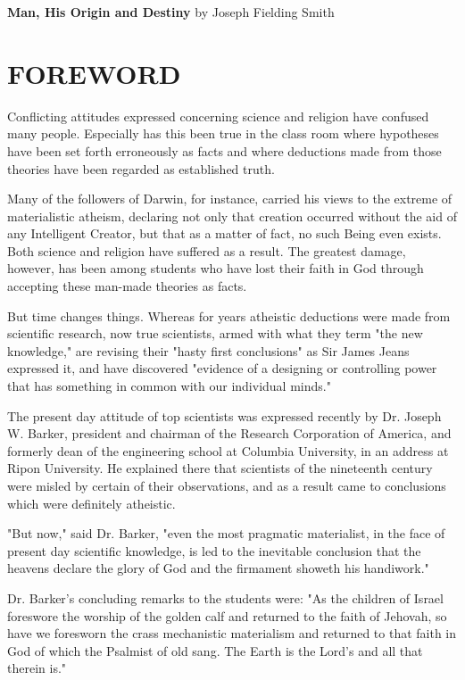 \begin{flushleft}
\fontsize{35}{35}\sffamily
\textbf{Man, His Origin and Destiny}
\Large{by Joseph Fielding Smith}
\end{flushleft}

\section{FOREWORD}
\thispagestyle{empty}

Conflicting attitudes expressed concerning science and religion have confused many people.
Especially has this been true in the class room where hypotheses have been set forth
erroneously as facts and where deductions made from those theories have been regarded as
established truth.

Many of the followers of Darwin, for instance, carried his views to the extreme of
materialistic atheism, declaring not only that creation occurred without the aid of any
Intelligent Creator, but that as a matter of fact, no such Being even exists.
Both science and religion have suffered as a result. The greatest damage, however, has been
among students who have lost their faith in God through accepting these man-made theories
as facts.

But time changes things. Whereas for years atheistic deductions were made from scientific
research, now true scientists, armed with what they term "the new knowledge," are revising
their "hasty first conclusions" as Sir James Jeans expressed it, and have discovered "evidence
of a designing or controlling power that has something in common with our individual
minds."

The present day attitude of top scientists was expressed recently by Dr. Joseph W. Barker,
president and chairman of the Research Corporation of America, and formerly dean of the
engineering school at Columbia University, in an address at Ripon University. He explained
there that scientists of the nineteenth century were misled by certain of their observations,
and as a result came to conclusions which were definitely atheistic.

"But now," said Dr. Barker, "even the most pragmatic materialist, in the face of present day
scientific knowledge, is led to the inevitable conclusion that the heavens declare the glory of
God and the firmament showeth his handiwork."

Dr. Barker's concluding remarks to the students were: "As the children of Israel foreswore
the worship of the golden calf and returned to the faith of Jehovah, so have we foresworn the
crass mechanistic materialism and returned to that faith in God of which the Psalmist of old
sang. The Earth is the Lord's and all that therein is."

